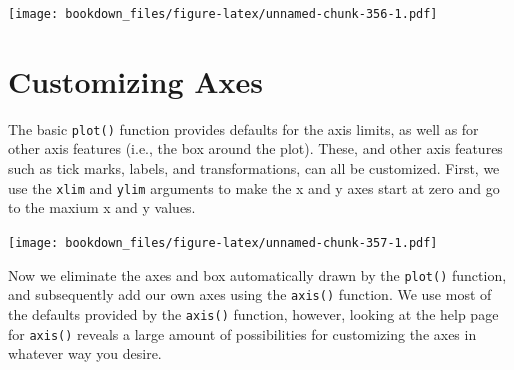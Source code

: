\documentclass[]{krantz}
\makeatletter
\newenvironment{Shaded}{\begin{snugshade}}{\end{snugshade}}
\newcommand{\KeywordTok}[1]{\textcolor[rgb]{0.27,0.27,0.27}{\textbf{#1}}}
\newcommand{\DataTypeTok}[1]{\textcolor[rgb]{0.27,0.27,0.27}{#1}}
\newcommand{\DecValTok}[1]{\textcolor[rgb]{0.06,0.06,0.06}{#1}}
\newcommand{\StringTok}[1]{\textcolor[rgb]{0.5,0.5,0.5}{#1}}
\newcommand{\OperatorTok}[1]{\textcolor[rgb]{0.43,0.43,0.43}{\textbf{#1}}}
\newcommand{\NormalTok}[1]{#1}
\newenvironment{kframe}{%
\medskip{}
\setlength{\fboxsep}{.8em}
 \def\at@end@of@kframe{}%
 \ifinner\ifhmode%
  \def\at@end@of@kframe{\end{minipage}}%
  \begin{minipage}{\columnwidth}%
 \fi\fi%
 \def\FrameCommand##1{\hskip\@totalleftmargin \hskip-\fboxsep
 \colorbox{shadecolor}{##1}\hskip-\fboxsep
     \hskip-\linewidth \hskip-\@totalleftmargin \hskip\columnwidth}%
 \MakeFramed {\advance\hsize-\width
   \@totalleftmargin\z@ \linewidth\hsize
   \@setminipage}}%
 {\par\unskip\endMakeFramed%
 \at@end@of@kframe}
\renewenvironment{Shaded}{\begin{kframe}}{\end{kframe}}
\makeatother
\begin{document}
\texttt{[image: bookdown\_files/figure-latex/unnamed-chunk-356-1.pdf]}

\section{Customizing Axes}\label{customizing-axes-1}

The basic \texttt{plot()} function provides defaults for the axis
limits, as well as for other axis features (i.e., the box around the
plot). These, and other axis features such as tick marks, labels, and
transformations, can all be customized. First, we use the \texttt{xlim}
and \texttt{ylim} arguments to make the x and y axes start at zero and
go to the maxium x and y values.

\begin{Shaded}
\end{Shaded}

\texttt{[image: bookdown\_files/figure-latex/unnamed-chunk-357-1.pdf]}

Now we eliminate the axes and box automatically drawn by the
\texttt{plot()} function, and subsequently add our own axes using the
\texttt{axis()} function. We use most of the defaults provided by the
\texttt{axis()} function, however, looking at the help page for
\texttt{axis()} reveals a large amount of possibilities for customizing
the axes in whatever way you desire.
\end{document}
